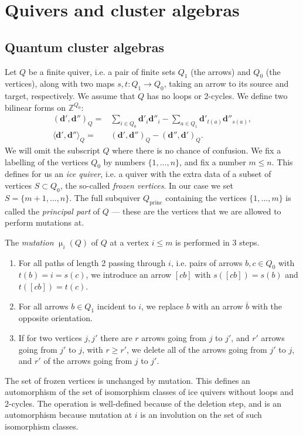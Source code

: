 \documentclass[a4paper,10pt]{amsart}
\newcommand{\dd}{\mathbf{d}}
\renewcommand{\mu}{\upmu}
\DeclareMathOperator{\princ}{princ}
\begin{document}
\section{Quivers and cluster algebras}\label{genCluSec}
\subsection{Quantum cluster algebras}
\label{cluSec}
Let $Q$ be a finite quiver, i.e. a pair of finite sets $Q_1$ (the arrows) and $Q_0$ (the vertices), along with two maps $s,t\colon Q_1\rightarrow Q_0$, taking an arrow to its source and target, respectively.  We assume that $Q$ has no loops or 2-cycles.  We define two bilinear forms on $\mathbb{Z}^{Q_0}$:
\begin{align}
(\dd',\dd'')_Q=&\sum_{i\in Q_0}\dd'_i\dd''_i-\sum_{a\in Q_1} \dd'_{t(a)}\dd''_{s(a)},\\
\langle \dd',\dd''\rangle_Q=&(\dd',\dd'')_Q-(\dd'',\dd')_Q.
\end{align}
We will omit the subscript $Q$ where there is no chance of confusion.  We fix a labelling of the vertices $Q_0$ by numbers $\{1,\ldots,n\}$, and fix a number $m\leq n$.  This defines for us an \textit{ice quiver}, i.e. a quiver with the extra data of a subset of vertices $S\subset Q_0$, the so-called \textit{frozen vertices}.  In our case we set $S=\{m+1,\ldots,n\}$.  The full subquiver $Q_{\princ}$ containing the vertices $\{1,\ldots,m\}$ is called the \textit{principal part} of $Q$ --- these are the vertices that we are allowed to perform mutations at.  

The \textit{mutation} $\mu_i(Q)$ of $Q$ at a vertex $i\leq m$ is performed in 3 steps.
\begin{enumerate}
\item
For all paths of length 2 passing through $i$, i.e. pairs of arrows $b,c\in Q_0$ with $t(b)=i=s(c)$, we introduce an arrow $[cb]$ with $s([cb])=s(b)$ and $t([cb])=t(c)$.
\item
For all arrows $b\in Q_1$ incident to $i$, we replace $b$ with an arrow $\overline{b}$ with the opposite orientation.
\item
If for two vertices $j,j'$ there are $r$ arrows going from $j$ to $j'$, and $r'$ arrows going from $j'$ to $j$, with $r\geq r'$, we delete all of the arrows going from $j'$ to $j$, and $r'$ of the arrows going from $j$ to $j'$.
\end{enumerate}
The set of frozen vertices is unchanged by mutation.  This defines an automorphism of the set of isomorphism classes of ice quivers without loops and 2-cycles.  The operation is well-defined because of the deletion step, and is an automorphism because mutation at $i$ is an involution on the set of such isomorphism classes.
\end{document}
